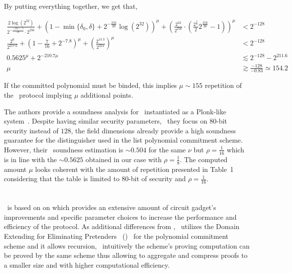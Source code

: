 \documentclass[a4paper,10pt]{article}
\begin{document}
		By putting everything together, we get that,
		
		\begin{align*}
			\frac{2 \log(2^{32})}{2^{-\frac{(256) \cdot 3}{20}} \cdot 2^{256}} +
				\left(1 - \min\{\delta_0,\delta\} + 2^{-\frac{256}{20}}\log(2^{32})\right)^{\mu} +
				\left(\frac{2^{32}}{2^{256}} \cdot \left(\frac{2^{\frac{3}{2}}}{2}
				2^{\frac{256}{20}} -1\right) \right)^\mu  &< 2^{-128}\\
			\frac{2^6}{2^{217.6}} +
				\left(1 - \frac{7}{16} + 2^{-7.8}\right)^{\mu} +
				\left(\frac{2^{13.3}}{2^{224}}\right)^\mu &< 2^{-128}\\
			0.5625^\mu + 2^{-210.7 \mu}
				&\lesssim 2^{-128} - 2^{211.6}\\
				\mu &\gtrsim \frac{-128}{-0.83} \simeq 154.2
		\end{align*}

		If the committed polynomial must be binded, this implies $\mu \sim 155$ repetition of the \FRI\
		protocol implying $\mu$ additional points.
		
		The authors provide a soundness analysis for \redshift\ instantiated as a Plonk-like
		system~\cite[Sec.6]{EPRINT:KPV19}.
		Despite having similar security parameters, \ie\ they focus on $80$-bit security instead
		of $128$, the field dimensions already provide a high soundness guarantee for the distinguisher
		used in the list polynomial commitment scheme.
		However, their \FRI\ soundness estimation is $\sim 0.504$ for the same $\nu$ but $\rho = \frac{1}{16}$
		which is in line with the $\sim 0.5625$ obtained in our case with $\rho = \frac{1}{8}$.
		The computed amount $\mu$ looks coherent with the amount of repetition presented in Table~1
		considering that the table is limited to $80$-bit of security and $\rho=\frac{1}{16}$.
		
		

		
	\section{\plonkyy}
		\plonkyy\ is based on  on which provides an extensive amount of
		circuit gadget's improvements and specific parameter choices to increase the performance
		and efficiency of the protocol.
		As additional differences from \redshift, \plonkyy\ utilizes the Domain Extending
		for Eliminating Pretenders \FRI\ (\DEEPFRI)~\cite{EPRINT:BGKS19}
		for the polynomial commitment scheme and it allows recursion, \ie\ intuitively the scheme's proving
		computation can be proved by the same scheme thus allowing to
		aggregate and compress proofs to a smaller size and with higher computational efficiency.
		
\end{document}
